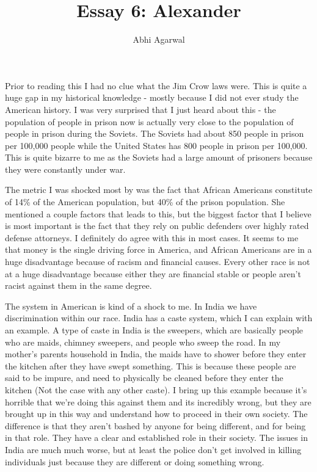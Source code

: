 \documentclass[11pt, oneside]{article}
\title{Essay 6: Alexander}
\author{Abhi Agarwal}
\date{}
\begin{document}
\maketitle

\par Prior to reading this I had no clue what the Jim Crow laws were. This is quite a huge gap in my historical knowledge - mostly because I did not ever study the American history. I was very surprised that I just heard about this - the population of people in prison now is actually very close to the population of people in prison during the Soviets. The Soviets had about 850 people in prison per 100,000 people while the United States has 800 people in prison per 100,000. This is quite bizarre to me as the Soviets had a large amount of prisoners because they were constantly under war. 
\par The metric I was shocked most by was the fact that African Americans constitute of 14\% of the American population, but 40\% of the prison population. She mentioned a couple factors that leads to this, but the biggest factor that I believe is most important is the fact that they rely on public defenders over highly rated defense attorneys. I definitely do agree with this in most cases. It seems to me that money is the single driving force in America, and African Americans are in a huge disadvantage because of racism and financial causes. Every other race is not at a huge disadvantage because either they are financial stable or people aren't racist against them in the same degree. 
\par The system in American is kind of a shock to me. In India we have discrimination within our race. India has a caste system, which I can explain with an example. A type of caste in India is the sweepers, which are basically people who are maids, chimney sweepers, and people who sweep the road. In my mother's parents household in India, the maids have to shower before they enter the kitchen after they have swept something. This is because these people are said to be impure, and need to physically be cleaned before they enter the kitchen (Not the case with any other caste). I bring up this example because it's horrible that we're doing this against them and its incredibly wrong, but they are brought up in this way and understand how to proceed in their own society. The difference is that they aren't bashed by anyone for being different, and for being in that role. They have a clear and established role in their society. The issues in India are much much worse, but at least the police don't get involved in killing individuals just because they are different or doing something wrong. 
\end{document}
